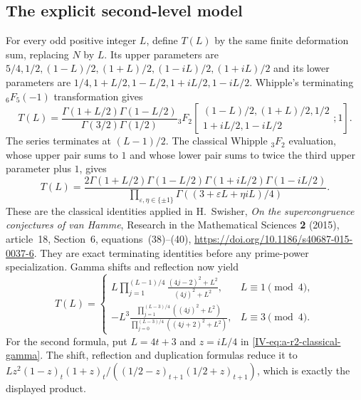 \documentclass[11pt,letterpaper]{article}
\numberwithin{equation}{section}
\begin{document}
\subsection{The explicit second-level model}
For every odd positive integer $L$, define $T(L)$ by the same
finite deformation sum, replacing $N$ by $L$. Its upper parameters
are $5/4,1/2,(1-L)/2,(1+L)/2,(1-iL)/2,(1+iL)/2$ and its lower
parameters are $1/4,1+L/2,1-L/2,1+iL/2,1-iL/2$.
Whipple's terminating ${}_6F_5(-1)$ transformation gives
\[
 T(L)=\frac{\Gamma(1+L/2)\Gamma(1-L/2)}
                {\Gamma(3/2)\Gamma(1/2)}
 {}_3F_2\!\left[
 \begin{matrix}(1-L)/2,(1+L)/2,1/2\\1+iL/2,1-iL/2\end{matrix};1
 \right].
\]
The series terminates at $(L-1)/2$. The classical Whipple
${}_3F_2$ evaluation, whose upper pair sums to $1$ and whose lower
pair sums to twice the third upper parameter plus $1$, gives
\begin{equation}\label{IV-eq:a-r2-classical-gamma}
 T(L)=
 \frac{2\Gamma(1+L/2)\Gamma(1-L/2)
          \Gamma(1+iL/2)\Gamma(1-iL/2)}
 {\displaystyle\prod_{\varepsilon,\eta\in\{\pm1\}}
          \Gamma((3+\varepsilon L+\eta iL)/4)}.
\end{equation}
These are the classical identities applied in H.~Swisher,
\emph{On the supercongruence conjectures of van Hamme},
Research in the Mathematical Sciences \textbf{2} (2015), article~18,
Section~6, equations~(38)--(40),
\url{https://doi.org/10.1186/s40687-015-0037-6}.
They are exact terminating identities before any prime-power
specialization. Gamma shifts and reflection now yield
\[
 T(L)=
 \begin{cases}
 L\displaystyle\prod_{j=1}^{(L-1)/4}
       \frac{(4j-2)^2+L^2}{(4j)^2+L^2},&L\equiv1\pmod4,\\[2mm]
 -L^3\displaystyle\frac{\prod_{j=1}^{(L-3)/4}((4j)^2+L^2)}
       {\prod_{j=0}^{(L-3)/4}((4j+2)^2+L^2)},&L\equiv3\pmod4.
 \end{cases}
\]
For the second formula, put $L=4t+3$ and $z=iL/4$ in
\eqref{IV-eq:a-r2-classical-gamma}. The shift, reflection and duplication formulas reduce it to
$Lz^2(1-z)_t(1+z)_t/((1/2-z)_{t+1}(1/2+z)_{t+1})$, which is exactly
the displayed product.
\end{document}
